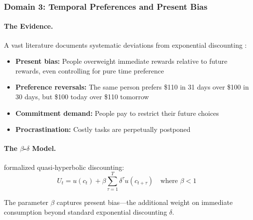 

\subsubsection{Domain 3: Temporal Preferences and Present Bias}

\paragraph{The Evidence.}
A vast literature documents systematic deviations from exponential discounting
\citep{frederick2002time}:
\begin{itemize}
  \item \textbf{Present bias:} People overweight immediate rewards relative to 
        future rewards, even controlling for pure time preference
  \item \textbf{Preference reversals:} The same person prefers \$110 in 31 days 
        over \$100 in 30 days, but \$100 today over \$110 tomorrow
  \item \textbf{Commitment demand:} People pay to restrict their future choices
  \item \textbf{Procrastination:} Costly tasks are perpetually postponed
\end{itemize}

\paragraph{The $\beta$-$\delta$ Model.}
\citet{laibson1997} formalized quasi-hyperbolic discounting:
\begin{equation}
  U_t = u(c_t) + \beta \sum_{\tau=1}^{T} \delta^\tau u(c_{t+\tau}) 
  \quad \text{where } \beta < 1
  \label{eq:beta-delta}
\end{equation}

The parameter $\beta$ captures present bias---the additional weight on immediate
consumption beyond standard exponential discounting $\delta$.

